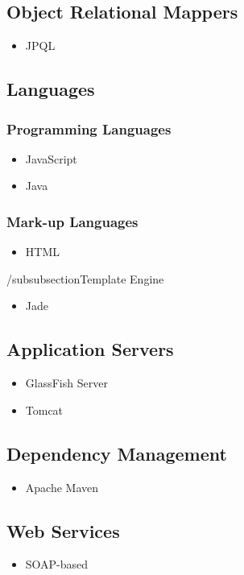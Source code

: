 \subsection{Object Relational Mappers}
\begin{itemize}
	\item JPQL
\end{itemize}

\subsection{Languages}
\subsubsection{Programming Languages}
\begin{itemize}
	\item JavaScript	
	\item Java
\end{itemize}

\subsubsection{Mark-up Languages}
\begin{itemize}
	\item HTML
\end{itemize}

/subsubsection{Template Engine}
\begin{itemize}
	\item Jade
\end{itemize}


\subsection{Application Servers}
\begin{itemize}
	\item GlassFish Server
	\item Tomcat
\end{itemize}

\subsection{Dependency Management}
\begin{itemize}
	\item Apache Maven
\end{itemize}

\subsection{Web Services}
\begin{itemize}
	\item SOAP-based
\end{itemize} 


